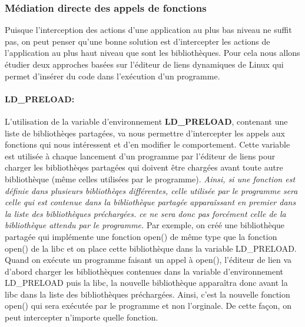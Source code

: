 \subsubsection{Médiation directe des appels de fonctions}

Puisque l'interception des actions d'une application au plus bas niveau ne
suffit pas, on peut penser qu'une bonne solution est d'intercepter
les actions de l'application au plus haut niveau que sont les
bibliothèques. Pour cela nous allons étudier deux approches basées sur l'éditeur
de liens dynamiques de Linux qui permet d'insérer du code dans l'exécution d'un
programme.

\paragraph{LD\_PRELOAD:}
\label{paragraphe:LDPreload}

L'utilisation de la variable d'environnement
\textbf{LD\_PRELOAD}\citet{LDPreload}, contenant une liste de
bibliothèqes partagées, va nous permettre d'intercepter les appels aux fonctions
qui nous intéressent et d'en modifier le comportement. Cette variable est
utilisée à chaque lancement d'un programme par l'éditeur de liens pour charger
les bibliothèqes partagées qui doivent être chargées avant toute autre
bibliothèque (même celles utilisées par le programme). \textit{Ainsi, si une fonction
est définie dans plusieurs bibliothèqes différentes, celle utilisée par le
programme sera celle qui est contenue dans la bibliothèque partagée apparaîssant
en premier dans la liste des bibliothèques préchargées. ce ne sera donc pas forcément celle de
la bibliothèque attendu par le programme.} Par exemple, on créé une bibliothèque
partagée qui implémente une fonction open() de même type que la fonction open()
de la libc et on place cette bibliothèque dans la variable LD\_PRELOAD. Quand on
exécute un programme faisant un appel à open(), l'éditeur de lien va d'abord
charger les bibliothèques contenues dans la variable d'environnement LD\_PRELOAD
puis la libc, la nouvelle bibliothèque apparaîtra donc avant la libc dans la
liste des bibliothèques préchargées. Ainsi, c'est la nouvelle fonction open()
qui sera exécutée par le programme et non l'orginale. De cette façon, on
peut intercepter n'importe quelle fonction.

